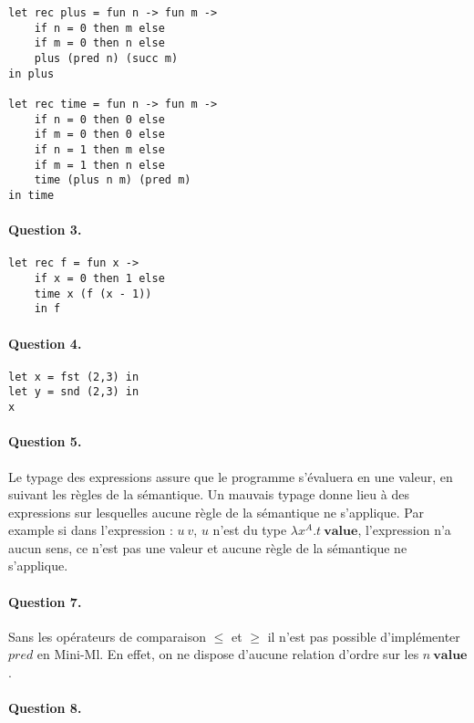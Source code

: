 \documentclass[12pt]{article}
\begin{document}
\begin{verbatim}
let rec plus = fun n -> fun m ->
	if n = 0 then m else
	if m = 0 then n else
	plus (pred n) (succ m)
in plus

let rec time = fun n -> fun m ->
	if n = 0 then 0 else
	if m = 0 then 0 else
	if n = 1 then m else
	if m = 1 then n else
	time (plus n m) (pred m)
in time
\end{verbatim}

\paragraph{Question 3.}

\begin{verbatim}
let rec f = fun x ->
	if x = 0 then 1 else
	time x (f (x - 1))
	in f
\end{verbatim}


\paragraph{Question 4.}

\begin{verbatim}
let x = fst (2,3) in
let y = snd (2,3) in
x
\end{verbatim}

\paragraph{Question 5.}

Le typage des expressions assure que le programme s'évaluera en une valeur, en suivant les règles de la sémantique. Un mauvais typage donne lieu à des expressions sur lesquelles aucune règle de la sémantique ne s'applique. Par example si dans l'expression : $u \ v$, $u$
n'est du type $\lambda x^{A}.t \ \textbf{value}$, l'expression n'a aucun sens, ce n'est pas une valeur et aucune règle de la sémantique ne s'applique.


\paragraph{Question 7.}

Sans les opérateurs de comparaison $\le$ et $\ge$ il n'est pas possible d'implémenter $pred$ en Mini-Ml. En effet, on ne dispose d'aucune relation d'ordre sur les $n \ \textbf{value}$.


\paragraph{Question 8.}
\end{document}

